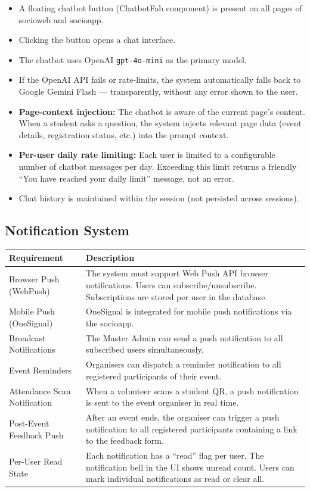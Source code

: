 \documentclass[12pt,a4paper]{article}
\begin{document}
\begin{itemize}[leftmargin=*]
    \item A floating chatbot button (ChatbotFab component) is present on all pages of socioweb and socioapp.
    \item Clicking the button opens a chat interface.
    \item The chatbot uses OpenAI \texttt{gpt-4o-mini} as the primary model.
    \item If the OpenAI API fails or rate-limits, the system automatically falls back to Google Gemini Flash — transparently, without any error shown to the user.
    \item \textbf{Page-context injection:} The chatbot is aware of the current page's content. When a student asks a question, the system injects relevant page data (event details, registration status, etc.) into the prompt context.
    \item \textbf{Per-user daily rate limiting:} Each user is limited to a configurable number of chatbot messages per day. Exceeding this limit returns a friendly ``You have reached your daily limit'' message, not an error.
    \item Chat history is maintained within the session (not persisted across sessions).
\end{itemize}

\subsection{Notification System}

\begin{tabularx}{\textwidth}{L{4.5cm} X}
\toprule
{}
\textbf{Requirement} & \textbf{Description} \\
\midrule
Browser Push (WebPush) & The system must support Web Push API browser notifications. Users can subscribe/unsubscribe. Subscriptions are stored per user in the database. \\
Mobile Push (OneSignal) & OneSignal is integrated for mobile push notifications via the socioapp. \\
Broadcast Notifications & The Master Admin can send a push notification to all subscribed users simultaneously. \\
Event Reminders & Organisers can dispatch a reminder notification to all registered participants of their event. \\
Attendance Scan Notification & When a volunteer scans a student QR, a push notification is sent to the event organiser in real time. \\
Post-Event Feedback Push & After an event ends, the organiser can trigger a push notification to all registered participants containing a link to the feedback form. \\
Per-User Read State & Each notification has a ``read'' flag per user. The notification bell in the UI shows unread count. Users can mark individual notifications as read or clear all. \\
\bottomrule
\end{tabularx}
\end{document}
